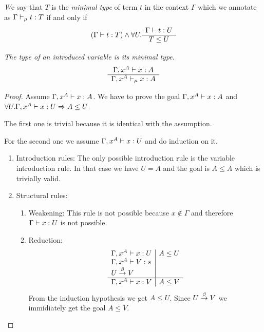 \begin{definition}
    \emph We say that $T$ is the \emph{minimal type} of term $t$ in the
    context $\Gamma$ which we annotate as $\Gamma \vdash_\mu t: T$ if and only
    if
    $$
    (\Gamma \vdash t: T)
    \land
    \forall U. \begin{array}{c} \Gamma \vdash t: U \\ \hline T \le U\end{array}
    $$
\end{definition}


\begin{lemma}
    \label{MinimalTypeOfVariable}
    \emph{The type of an introduced variable is its minimal type}.
    $$
    \begin{array}{c} 
        \Gamma,x^A \vdash x: A
     \\ \hline 
        \Gamma, x^A \vdash_\mu x: A
    \end{array}
    $$

    \begin{proof}
        Assume $\Gamma, x^A \vdash x: A$. We have to prove the goal
        $\Gamma, x^A \vdash x: A$ and
        $\forall U. \Gamma, x^A \vdash x: U \Rightarrow A \le U$.

        The first one is trivial because it is identical with the assumption.

        For the second one we assume $\Gamma, x^A \vdash x: U$ and do
        induction on it.
        \begin{enumerate}
            \item Introduction rules: The only possible introduction rule is the
                variable introduction rule. In that case we have $U = A$ and the
                goal is $A \le A$ which is trivially valid.

            \item Structural rules:
            \begin{enumerate}
                \item Weakening: This rule is not possible because $x \notin
                    \Gamma$ and therefore $\Gamma \vdash x: U$ is not possible.

                \item Reduction:
                $$
                \begin{array}{l|l}
                    \Gamma, x^A \vdash x: U
                    &
                    A \le U
                    \\
                    \Gamma, x^A \vdash V: s
                    \\
                    U \stackrel{\beta}{\to} V
                    \\
                    \hline
                    \Gamma, x^A \vdash x: V
                    &
                    A \le V
                \end{array}
                $$
                From the induction hypothesis we get $A \le U$. Since $U \stackrel{\beta}{\to}
                    V$ we immidiately get the goal $A \le V$.


\end{enumerate}
\end{enumerate}
\end{proof}
\end{lemma}
